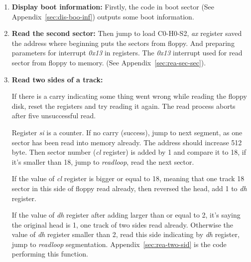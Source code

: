 \documentclass{swfcthesis}
\begin{document}
\begin{enumerate}
\item \textbf{Display boot information:} Firstly, the code in boot sector (See
  Appendix~\ref{sec:dis-boo-inf}) outputs some boot information. 
\item \textbf{Read the second sector:} Then jump to load C0-H0-S2, \emph{ax} register
  saved the address where beginning puts the sectors from floppy. And preparing parameters
  for interrupt \emph{0x13} in registers. The \emph{0x13} interrupt used for read
  sector from floppy to memory. (See Appendix~\ref{sec:rea-sec-sec}).
\item \textbf{Read two sides of a track:}
  
  If there is a carry indicating some thing went wrong while reading the floppy disk,
  reset the registers and try reading it again. The read process aborts after five
  unsuccessful read.

  Register \emph{si} is a counter. If no carry (success), jump to next segment, as one
  sector has been read into memory already. The address should increase 512 byte. Then
  sector number (\emph{cl} register) is added by 1 and compare it to 18, if it's smaller
  than 18, jump to \emph{readloop}, read the next sector.

  If the value of \emph{cl} register is bigger or equal to 18, meaning that one track
  18 sector in this side of floppy read already, then reversed the head, add 1 to
  \emph{dh} register.

  If the value of \emph{dh} register after adding larger than or equal to 2, it's saying
  the original head is 1, one track of two sides read already. Otherwise the value of
  \emph{dh} register smaller than 2, read this side indicating by \emph{dh} register,
  jump to \emph{readloop} segmentation. Appendix~\ref{sec:rea-two-sid} is the code 
  performing this function.


\end{enumerate}
\end{document}

